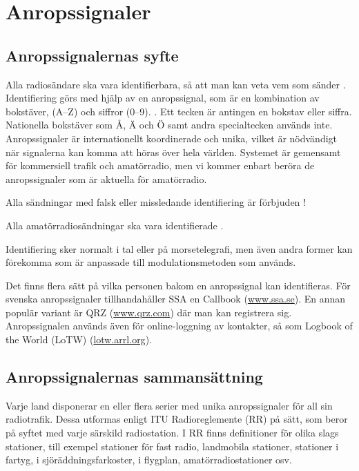 \section{Anropssignaler}

\subsection{Anropssignalernas syfte}

Alla radiosändare ska vara identifierbara, så att man kan veta vem
som sänder \cite[\S19.1]{ITU-RR}.
Identifiering görs med hjälp av en anropssignal, som är en kombination av
bokstäver, (A--Z) och siffror (0--9). \cite[\S19.45]{ITU-RR}.
Ett tecken är antingen en bokstav eller siffra.
Nationella bokstäver som Å, Ä och Ö samt andra specialtecken används inte.
Anropssignaler är internationellt koordinerade och unika, vilket är nödvändigt
när signalerna kan komma att höras över hela världen.
Systemet är gemensamt för kommersiell trafik och amatörradio, men vi kommer
enbart beröra de anropssignaler som är aktuella för amatörradio.

Alla sändningar med falsk eller missledande identifiering är förbjuden
\cite[\S19.2]{ITU-RR}!

Alla amatörradiosändningar ska vara identifierade \cite[\S19.4, \S19.5]{ITU-RR}.

Identifiering sker normalt i tal eller på morsetelegrafi, men även andra former
kan förekomma som är anpassade till modulationsmetoden som används.

Det finns flera sätt på vilka personen bakom en anropssignal kan identifieras.
För svenska anropssignaler tillhandahåller SSA en Callbook
(\href{http://www.ssa.se/}{www.ssa.se}).
En annan populär variant är QRZ (\href{https://www.qrz.com/}{www.qrz.com}) där
man kan registrera sig.
Anropssignalen används även för online-loggning av kontakter, så som
Logbook of the World (LoTW) (\href{https://lotw.arrl.org/}{lotw.arrl.org}).

\subsection{Anropssignalernas sammansättning}

Varje land disponerar en eller flera serier med unika anropssignaler för all
sin radiotrafik.
Dessa utformas enligt ITU Radioreglemente (RR) \cite[\S19]{ITU-RR} på sätt,
som beror på syftet med varje särskild radiostation.
I RR finns definitioner för olika slags stationer, till exempel stationer för fast
radio, landmobila stationer, stationer i fartyg, i sjöräddningsfarkoster,
i flygplan, amatörradiostationer osv.

